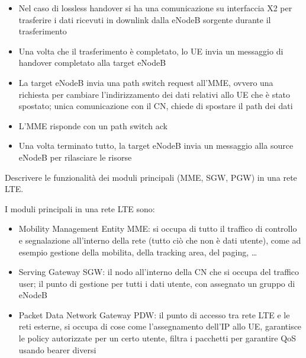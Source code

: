 \begin{questions}
\begin{solution}
\begin{itemize}
            \item Nel caso di lossless handover si ha una comunicazione su interfaccia X2 per trasferire i dati ricevuti in downlink dalla eNodeB sorgente durante il trasferimento
            
            \item Una volta che il trasferimento è completato, lo UE invia un messaggio di handover completato alla target eNodeB
            
            \item La target eNodeB invia una path switch request all'MME, ovvero una richiesta per cambiare l'indirizzamento dei dati relativi allo UE che è stato spostato; unica comunicazione con il CN, chiede di spostare il path dei dati
            
            \item L'MME risponde con un path switch ack
            
            \item Una volta terminato tutto, la target eNodeB invia un messaggio alla source eNodeB per rilasciare le risorse
        \end{itemize}
    \end{solution}
    
    \question Descrivere le funzionalità dei moduli principali (MME, SGW, PGW) in una rete LTE.
    
    \begin{solution}
        I moduli principali in una rete LTE sono: 
        \begin{itemize}
            \item Mobility Management Entity MME: si occupa di tutto il traffico di controllo e segnalazione all'interno della rete (tutto ciò che non è dati utente), come ad esempio gestione della mobilita, della tracking area, del paging, \dots
            
            \item Serving Gateway SGW: il nodo all'interno della CN che si occupa del traffico user; il punto di gestione per tutti i dati utente, con assegnato un gruppo di eNodeB
            
            \item Packet Data Network Gateway PDW: il punto di accesso tra rete LTE e le reti esterne, si occupa di cose come l'assegnamento dell'IP allo UE, garantisce le policy autorizzate per un certo utente, filtra i pacchetti per garantire QoS usando bearer diversi
        \end{itemize}
    \end{solution}
    

\end{questions}
